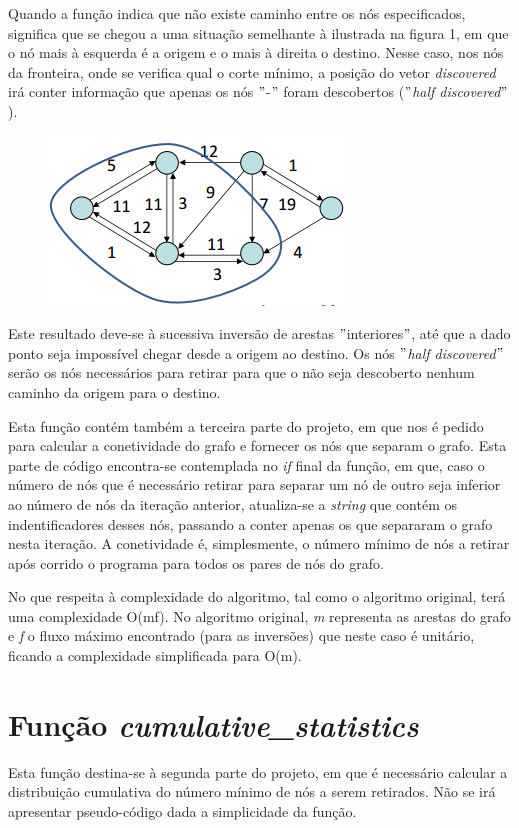 \documentclass[a4paper]{article}
\begin{document}
Quando a função indica que não existe caminho entre os nós especificados, significa que se chegou a uma situação semelhante à ilustrada na figura 1, em que o nó mais à esquerda é a origem e o mais à direita o destino. Nesse caso, nos nós da fronteira, onde se verifica qual o corte mínimo, a posição do vetor \textit{discovered} irá conter informação que apenas os nós $"$-$"$ foram descobertos ($"$\textit{half discovered}$"$).


\begin{figure}[hb]
  \centering
  \includegraphics[scale=0.50]{slides.png}
  \caption{}
\end{figure}

Este resultado deve-se à sucessiva inversão de arestas $"$interiores$"$, até que a dado ponto seja impossível chegar desde a origem ao destino. Os nós $"$\textit{half discovered}$"$ serão os nós necessários para retirar para que o não seja descoberto nenhum caminho da origem para o destino.

Esta função contém também a terceira parte do projeto, em que nos é pedido para calcular a conetividade do grafo e fornecer os nós que separam o grafo. Esta parte de código encontra-se contemplada no \textit{if} final da função, em que, caso o número de nós que é necessário retirar para separar um nó de outro seja inferior ao número de nós da iteração anterior, atualiza-se a \textit{string} que contém os indentificadores desses nós, passando a conter apenas os que separaram o grafo nesta iteração. A conetividade é, simplesmente, o número mínimo de nós a retirar após corrido o programa para todos os pares de nós do grafo.

No que respeita à complexidade do algoritmo, tal como o algoritmo original, terá uma complexidade O(mf). No algoritmo original, \textit{m} representa as arestas do grafo e \textit{f} o fluxo máximo encontrado (para as inversões) que neste caso é unitário, ficando a complexidade simplificada para O(m).

\section{Função \textit{cumulative\_statistics}}
Esta função destina-se à segunda parte do projeto, em que é necessário calcular a distribuição cumulativa do número mínimo de nós a serem retirados. Não se irá apresentar pseudo-código dada a simplicidade da função.
\end{document}
